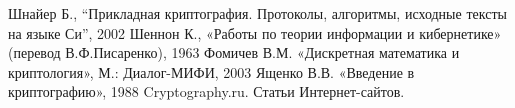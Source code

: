 \begin{thebibliography}{1}
 Шнайер Б., ``Прикладная криптография. Протоколы, алгоритмы, исходные тексты на языке Си'', 2002
 Шеннон К., «Работы по теории информации и кибернетике» (перевод В.Ф.Писаренко), 1963
 Фомичев В.М. «Дискретная математика и криптология», М.: Диалог-МИФИ, 2003
 Ященко В.В. «Введение в криптографию», 1988
 Cryptography.ru. Статьи Интернет-сайтов. 
\end{thebibliography}
